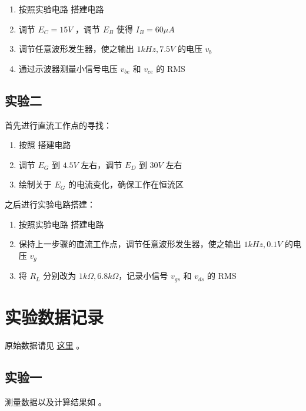 \documentclass[lang=cn,11pt,a4paper,cite=authoryear]{elegantpaper}
\begin{document}
\begin{enumerate}
    \item 按照实验电路  搭建电路
    \item 调节 \(E_C = 15 V\) ，调节 \(E_B\) 使得 \(I_B = 60 \mu A\) 
    \item 调节任意波形发生器，使之输出 \(1 kHz, 7.5 V \) 的电压 \(v_b\) 
    \item 通过示波器测量小信号电压 \(v_{be}\) 和 \(v_{ce}\) 的 RMS 
\end{enumerate}

\subsection{实验二} 

首先进行直流工作点的寻找：

\begin{enumerate}
    \item 按照  搭建电路
    \item 调节 \(E_G\) 到 \(4.5 V\) 左右，调节 \(E_D\) 到 \(30 V\) 左右
    \item 绘制关于 \(E_G\) 的电流变化，确保工作在恒流区
\end{enumerate}


之后进行实验电路搭建： 

\begin{enumerate}
    \item 按照实验电路  搭建电路
    \item 保持上一步骤的直流工作点，调节任意波形发生器，使之输出 \(1 kHz, 0.1 V \) 的电压 \(v_g\) 
    \item 将 \(R_L\) 分别改为 \(1 k\Omega , 6.8 k\Omega\)，记录小信号 \(v_{gs}\) 和 \(v_{ds}\) 的 RMS 
\end{enumerate}

\section{实验数据记录}


原始数据请见 \href{https://github.com/PannenetsF/Mirco-Electronic-Device-Experiment/tree/main/homework/hw11}{这里} 。

\subsection{实验一}

测量数据以及计算结果如  。
\end{document}
